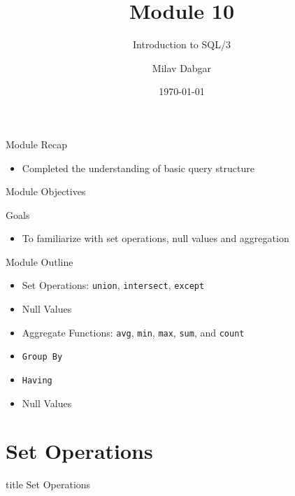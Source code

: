 \documentclass[aspectratio=169, xcolor=dvipsnames]{beamer}
\title{Module 10}
\subtitle{Introduction to SQL/3}
\author{Milav Dabgar}
\institute{www.milav.in}
\date{\today}
\begin{document}
\begin{frame}
    \titlepage
\end{frame}

\begin{frame}{Module Recap}
    \begin{itemize}[<+->]
        \item Completed the understanding of basic query structure
    \end{itemize}
\end{frame}

\begin{frame}{Module Objectives}
    \begin{block}{Goals}
        \begin{itemize}[<+->]
            \item To familiarize with set operations, null values and aggregation
        \end{itemize}
    \end{block}
\end{frame}

\begin{frame}{Module Outline}
    \begin{itemize}[<+->]
        \item Set Operations: \texttt{union}, \texttt{intersect}, \texttt{except}
        \item Null Values
        \item Aggregate Functions: \texttt{avg}, \texttt{min}, \texttt{max}, \texttt{sum}, and \texttt{count}
        \item \texttt{Group By}
        \item \texttt{Having}
        \item Null Values
    \end{itemize}
\end{frame}

\section{Set Operations}

\begin{frame}
  \vfill
  \centering
  \begin{beamercolorbox}[sep=8pt,center,shadow=true,rounded=true]{title}
    Set Operations\par%
  \end{beamercolorbox}
  \vfill
\end{frame}
\end{document}
